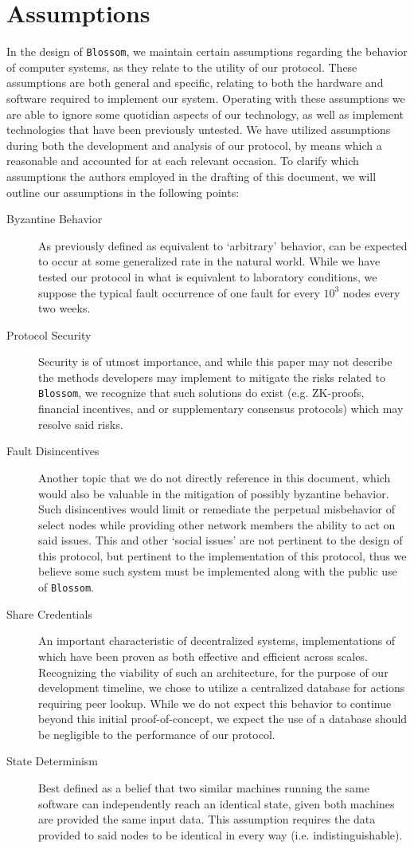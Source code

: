 \section{Assumptions}\label{assum}
In the design of \texttt{Blossom}, we maintain certain assumptions regarding the behavior of computer systems, as they relate to the utility of our protocol. These assumptions are both general and specific, relating to both the hardware and software required to implement our system. Operating with these assumptions we are able to ignore some quotidian aspects of our technology, as well as implement technologies that have been previously untested. We have utilized assumptions during both the development and analysis of our protocol, by means which a reasonable and accounted for at each relevant occasion. To clarify which assumptions the authors employed in the drafting of this document, we will outline our assumptions in the following points:
\begin{description}
\item[Byzantine Behavior] As previously defined as equivalent to ‘arbitrary’ behavior, can be expected to occur at some generalized rate in the natural world. While we have tested our protocol in what is equivalent to laboratory conditions, we suppose the typical fault occurrence of one fault for every \(10^3\) nodes every two weeks.
\item[Protocol Security] Security is of utmost importance, and while this paper may not describe the methods developers may implement to mitigate the risks related to \texttt{Blossom}, we recognize that such solutions do exist (e.g. ZK-proofs, financial incentives, and or supplementary consensus protocols) which may resolve said risks.
\item[Fault Disincentives] Another topic that we do not directly reference in this document, which would also be valuable in the mitigation of possibly byzantine behavior. Such disincentives would limit or remediate the perpetual misbehavior of select nodes while providing other network members the ability to act on said issues. This and other ‘social issues’ are not pertinent to the design of this protocol, but pertinent to the implementation of this protocol, thus we believe some such system must be implemented along with the public use of \texttt{Blossom}.
\item[Share Credentials] An important characteristic of decentralized systems, implementations of which have been proven as both effective and efficient across scales. Recognizing the viability of such an architecture, for the purpose of our development timeline, we chose to utilize a centralized database for actions requiring peer lookup. While we do not expect this behavior to continue beyond this initial proof-of-concept, we expect the use of a database should be negligible to the performance of our protocol.
\item[State Determinism] Best defined as a belief that two similar machines running the same software can independently reach an identical state, given both machines are provided the same input data. This assumption requires the data provided to said nodes to be identical in every way (i.e. indistinguishable).
\end{description}
